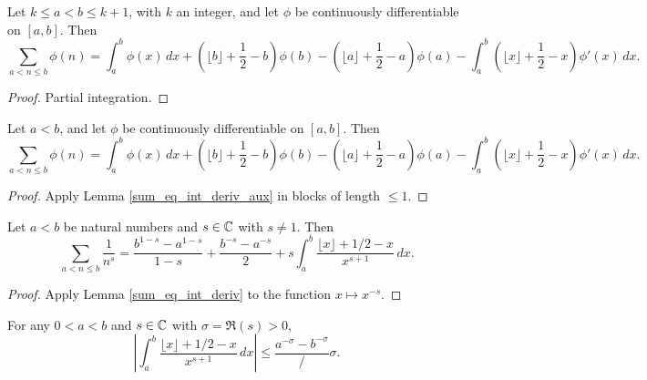 
\begin{lemma}\label{sum_eq_int_deriv_aux}\leanok
  Let $k \le a < b\le k+1$, with $k$ an integer, and let $\phi$ be continuously differentiable on
  $[a, b]$.
  Then
  \[
  \sum_{a < n \le b} \phi(n) = \int_a^b \phi(x) \, dx + \left(\lfloor b \rfloor + \frac{1}{2} - b\right) \phi(b) - \left(\lfloor a \rfloor + \frac{1}{2} - a\right) \phi(a) - \int_a^b \left(\lfloor x \rfloor + \frac{1}{2} - x\right) \phi'(x) \, dx.
  \]
\end{lemma}


\begin{proof}\leanok
Partial integration.
\end{proof}


\begin{lemma}\label{sum_eq_int_deriv}\leanok
  Let $a < b$, and let $\phi$ be continuously differentiable on $[a, b]$.
  Then
  \[
  \sum_{a < n \le b} \phi(n) = \int_a^b \phi(x) \, dx + \left(\lfloor b \rfloor + \frac{1}{2} - b\right) \phi(b) - \left(\lfloor a \rfloor + \frac{1}{2} - a\right) \phi(a) - \int_a^b \left(\lfloor x \rfloor + \frac{1}{2} - x\right) \phi'(x) \, dx.
  \]
\end{lemma}


\begin{proof}
  Apply Lemma \ref{sum_eq_int_deriv_aux} in blocks of length $\le 1$.
\end{proof}


\begin{lemma}\label{ZetaSum_aux1}\leanok
  Let $a < b$ be natural numbers and $s\in \C$ with $s \ne 1$.
  Then
  \[
  \sum_{a < n \le b} \frac{1}{n^s} =  \frac{b^{1-s} - a^{1-s}}{1-s} + \frac{b^{-s}-a^{-s}}{2} + s \int_a^b \frac{\lfloor x\rfloor + 1/2 - x}{x^{s+1}} \, dx.
  \]
\end{lemma}


\begin{proof}
  Apply Lemma \ref{sum_eq_int_deriv} to the function $x \mapsto x^{-s}$.
\end{proof}


\begin{lemma}\label{ZetaSum_aux1a}\leanok
For any $0 < a < b$ and  $s \in \C$ with $\sigma=\Re(s)>0$,
$$
\left|\int_a^b \frac{\lfloor x\rfloor + 1/2 - x}{x^{s+1}} \, dx\right|
\le \frac{a^{-\sigma}-b^{-\sigma}}/{\sigma}.
$$
\end{lemma}


